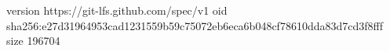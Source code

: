 version https://git-lfs.github.com/spec/v1
oid sha256:e27d31964953cad1231559b59c75072eb6eca6b048cf78610dda83d7cd3f8fff
size 196704
